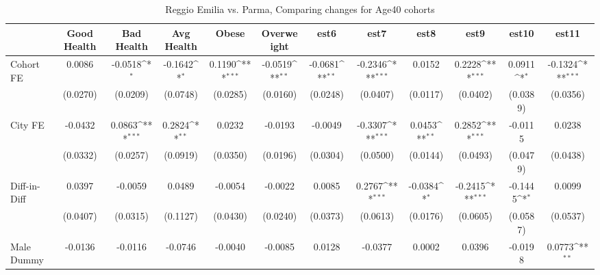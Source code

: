 \begin{table}[htbp]\centering
\def\sym#1{\ifmmode^{#1}\else\(^{#1}\)\fi}
\caption{Reggio Emilia vs. Parma, Comparing changes for Age40 cohorts}
\begin{tabular}{l*{11}{c}}
\toprule
            &\multicolumn{1}{c}{Good Health}&\multicolumn{1}{c}{Bad Health}&\multicolumn{1}{c}{Avg Health}&\multicolumn{1}{c}{Obese}&\multicolumn{1}{c}{Overweight}&\multicolumn{1}{c}{est6}&\multicolumn{1}{c}{est7}&\multicolumn{1}{c}{est8}&\multicolumn{1}{c}{est9}&\multicolumn{1}{c}{est10}&\multicolumn{1}{c}{est11}\\
\midrule
Cohort FE   &      0.0086         &     -0.0518\sym{*}  &     -0.1642\sym{*}  &      0.1190\sym{***}&     -0.0519\sym{**} &     -0.0681\sym{**} &     -0.2346\sym{***}&      0.0152         &      0.2228\sym{***}&      0.0911\sym{*}  &     -0.1324\sym{***}\\
            &    (0.0270)         &    (0.0209)         &    (0.0748)         &    (0.0285)         &    (0.0160)         &    (0.0248)         &    (0.0407)         &    (0.0117)         &    (0.0402)         &    (0.0389)         &    (0.0356)         \\
\addlinespace
City FE     &     -0.0432         &      0.0863\sym{***}&      0.2824\sym{**} &      0.0232         &     -0.0193         &     -0.0049         &     -0.3307\sym{***}&      0.0453\sym{**} &      0.2852\sym{***}&     -0.0115         &      0.0238         \\
            &    (0.0332)         &    (0.0257)         &    (0.0919)         &    (0.0350)         &    (0.0196)         &    (0.0304)         &    (0.0500)         &    (0.0144)         &    (0.0493)         &    (0.0479)         &    (0.0438)         \\
\addlinespace
Diff-in-Diff&      0.0397         &     -0.0059         &      0.0489         &     -0.0054         &     -0.0022         &      0.0085         &      0.2767\sym{***}&     -0.0384\sym{*}  &     -0.2415\sym{***}&     -0.1445\sym{*}  &      0.0099         \\
            &    (0.0407)         &    (0.0315)         &    (0.1127)         &    (0.0430)         &    (0.0240)         &    (0.0373)         &    (0.0613)         &    (0.0176)         &    (0.0605)         &    (0.0587)         &    (0.0537)         \\
\addlinespace
Male Dummy  &     -0.0136         &     -0.0116         &     -0.0746         &     -0.0040         &     -0.0085         &      0.0128         &     -0.0377         &      0.0002         &      0.0396         &     -0.0198         &      0.0773\sym{**} \\

\end{tabular}
\end{table}
